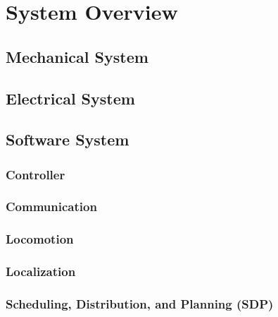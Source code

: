 \section{System Overview}
\label{sec:system_overview}

\subsection{Mechanical System}
\label{sec:mechanical}

\subsection{Electrical System}
\label{sec:electrical}

\subsection{Software System}
\label{sec:software}

\subsubsection{Controller}
\label{sec:sw_controller}

\subsubsection{Communication}
\label{sec:sw_comm}

\subsubsection{Locomotion}
\label{sec:sw_locomotion}

\subsubsection{Localization}
\label{sec:sw_localization}

\subsubsection{Scheduling, Distribution, and Planning (SDP)}
\label{sec:sw_sdp}


